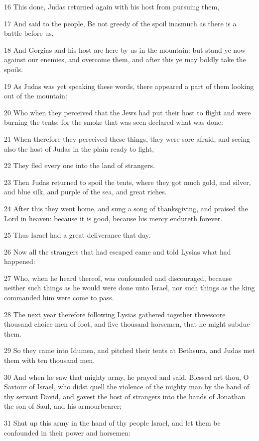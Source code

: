 \par 16 This done, Judas returned again with his host from pursuing them,
\par 17 And said to the people, Be not greedy of the spoil inasmuch as there is a battle before us,
\par 18 And Gorgias and his host are here by us in the mountain: but stand ye now against our enemies, and overcome them, and after this ye may boldly take the spoils.
\par 19 As Judas was yet speaking these words, there appeared a part of them looking out of the mountain:
\par 20 Who when they perceived that the Jews had put their host to flight and were burning the tents; for the smoke that was seen declared what was done:
\par 21 When therefore they perceived these things, they were sore afraid, and seeing also the host of Judas in the plain ready to fight,
\par 22 They fled every one into the land of strangers.
\par 23 Then Judas returned to spoil the tents, where they got much gold, and silver, and blue silk, and purple of the sea, and great riches.
\par 24 After this they went home, and sung a song of thanksgiving, and praised the Lord in heaven: because it is good, because his mercy endureth forever.
\par 25 Thus Israel had a great deliverance that day.
\par 26 Now all the strangers that had escaped came and told Lysias what had happened:
\par 27 Who, when he heard thereof, was confounded and discouraged, because neither such things as he would were done unto Israel, nor such things as the king commanded him were come to pass.
\par 28 The next year therefore following Lysias gathered together threescore thousand choice men of foot, and five thousand horsemen, that he might subdue them.
\par 29 So they came into Idumea, and pitched their tents at Bethsura, and Judas met them with ten thousand men.
\par 30 And when he saw that mighty army, he prayed and said, Blessed art thou, O Saviour of Israel, who didst quell the violence of the mighty man by the hand of thy servant David, and gavest the host of strangers into the hands of Jonathan the son of Saul, and his armourbearer;
\par 31 Shut up this army in the hand of thy people Israel, and let them be confounded in their power and horsemen:
